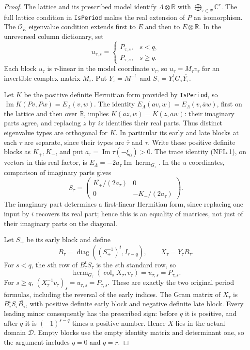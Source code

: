 \documentclass[11pt,a4paper]{article}
\numberwithin{equation}{section}
\theoremstyle{remark}\newtheorem{remark}[theorem]{Remark}
\begin{document}
\begin{proof}
The lattice and its prescribed model identify
$\Lambda\otimes\mathbb R$ with
$\bigoplus_{\tau\in\Psi}\mathbb C^r$.
The full lattice condition in \texttt{Is\allowbreak Period} makes the real
extension of $P$ an isomorphism.  The $\mathcal O_E$ eigenvalue
condition extends first to $E$ and then to $E\otimes\mathbb R$.
In the unreversed column dictionary, set
\[
 u_{\tau,s}=\begin{cases}
   \overline{P_{\tau,s}},&s<q,\\ P_{\tau,s},&s\ge q.
   \end{cases}
\]
Each block $u_\tau$ is $\tau$-linear in the model coordinate
$v_\tau$, so $u_\tau=M_\tau v_\tau$ for an invertible complex
matrix $M_\tau$.  Put $Y_\tau=M_\tau^{-1}$ and
$S_\tau=Y_\tau^tG_\tau\overline{Y_\tau}$.

Let $K$ be the positive definite Hermitian form provided by
\texttt{Is\allowbreak Period}, so $\operatorname{Im}K(Pv,Pw)=E_\Lambda(v,w)$.
The identity $E_\Lambda(av,w)=E_\Lambda(v,\bar a w)$, first
on the lattice and then over $\mathbb R$, implies
$K(az,w)=K(z,\bar a w)$: their imaginary parts agree, and
replacing $z$ by $iz$ identifies their real parts.
Thus distinct eigenvalue types are orthogonal for $K$.
In particular its early and late blocks at each $\tau$ are
separate, since their types are $\bar\tau$ and $\tau$.
Write these positive definite blocks as $K_+,K_-$, and put
$a_\tau=\operatorname{Im}\tau(-\xi_0)>0$.
The trace identity (NFL.1), on vectors in this real factor, is
$E_\Lambda=-2a_\tau\operatorname{Im}\operatorname{herm}_{G_\tau}$.
In the $u$ coordinates, comparison of imaginary parts gives
\[
 S_\tau=
 \begin{pmatrix}
  \overline{K_+}/(2a_\tau)&0\\
  0&-K_-/(2a_\tau)
 \end{pmatrix}.
 \tag{NFL.25}
\]
The imaginary part determines a first-linear Hermitian form,
since replacing one input by $i$ recovers its real part; hence
this is an equality of matrices, not just of their imaginary
parts on the diagonal.

Let $S_+$ be its early block and define
\[
 B_\tau=\operatorname{diag}((S_+^{-1})^t,I_{r-q}),
 \qquad X_\tau=Y_\tau B_\tau.
 \tag{NFL.26}
\]
For $s<q$, the $s$th row of $B_\tau^tS_\tau$ is the $s$th
standard row, so
\[
 \operatorname{herm}_{G_\tau}(\operatorname{col}_sX_\tau,v_\tau)
      =\overline{u_{\tau,s}}=P_{\tau,s}.
\]
For $s\ge q$, $(X_\tau^{-1}v_\tau)_s=u_{\tau,s}=P_{\tau,s}$.
These are exactly the two original period formulas, including
the reversal of the early indices.  The Gram matrix of $X_\tau$
is $B_\tau^tS_\tau\overline{B_\tau}$, with positive definite
early block and negative definite late block.  Every leading
minor consequently has the prescribed sign: before $q$ it
is positive, and after $q$ it is $(-1)^{s-q}$ times a positive
number.  Hence $X$ lies in the actual domain $\mathcal D$.
Empty blocks use the empty identity matrix and determinant one,
so the argument includes $q=0$ and $q=r$.
\end{proof}
\end{document}
